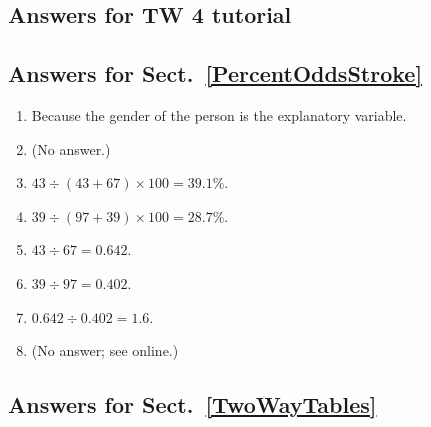 \documentclass[
  11pt,
  a4paper,
  krantz2]{krantz}
\providecommand{\tightlist}{%
  \setlength{\itemsep}{0pt}\setlength{\parskip}{0pt}}
\begin{document}
\begin{footnotesize}
\section{Answers for TW 4 tutorial}\label{Lecture4Answers}

\subsection*{Answers for Sect.~\ref{PercentOddsStroke}}\label{answers-for-sect.-refpercentoddsstroke}

\begin{enumerate}
\def\labelenumi{\arabic{enumi}.}
\tightlist
\item
  Because the gender of the person is the explanatory variable.
\item
  (No answer.)
\item
  \(43\div (43 + 67) \times 100 = 39.1\)\%.
\item
  \(39\div (97 + 39) \times 100 = 28.7\)\%.
\item
  \(43\div 67 = 0.642\).
\item
  \(39\div 97 = 0.402\).
\item
  \(0.642 \div 0.402 = 1.6\).
\item
  (No answer; see online.)
\end{enumerate}

\subsection*{Answers for Sect.~\ref{TwoWayTables}}\label{answers-for-sect.-reftwowaytables}


\end{footnotesize}
\end{document}
